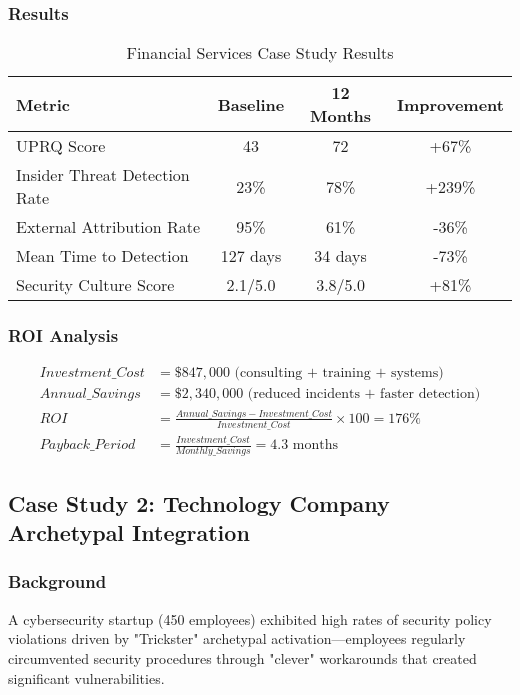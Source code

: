 \documentclass[11pt,a4paper]{article}
\begin{document}
\subsubsection{Results}

\begin{table}[H]
\centering
\caption{Financial Services Case Study Results}
\begin{tabular}{lccc}
\toprule
Metric & Baseline & 12 Months & Improvement \\
\midrule
UPRQ Score & 43 & 72 & +67\% \\
Insider Threat Detection Rate & 23\% & 78\% & +239\% \\
External Attribution Rate & 95\% & 61\% & -36\% \\
Mean Time to Detection & 127 days & 34 days & -73\% \\
Security Culture Score & 2.1/5.0 & 3.8/5.0 & +81\% \\
\bottomrule
\end{tabular}
\end{table}

\subsubsection{ROI Analysis}

\begin{align}
Investment\_Cost &= \$847,000 \text{ (consulting + training + systems)} \\
Annual\_Savings &= \$2,340,000 \text{ (reduced incidents + faster detection)} \\
ROI &= \frac{Annual\_Savings - Investment\_Cost}{Investment\_Cost} \times 100 = 176\% \\
Payback\_Period &= \frac{Investment\_Cost}{Monthly\_Savings} = 4.3 \text{ months}
\end{align}

\subsection{Case Study 2: Technology Company Archetypal Integration}

\subsubsection{Background}

A cybersecurity startup (450 employees) exhibited high rates of security policy violations driven by "Trickster" archetypal activation—employees regularly circumvented security procedures through "clever" workarounds that created significant vulnerabilities.
\end{document}

